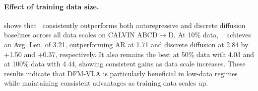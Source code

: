 \paragraph{Effect of training data size.}
 shows that \method~consistently outperforms both autoregressive and discrete diffusion baselines across all data scales on CALVIN ABCD$\rightarrow$D.
At 10\% data, \method~ achieves an Avg. Len. of 3.21, outperforming AR at 1.71 and discrete diffusion at 2.84 by +1.50 and +0.37, respectively. It also remains the best at 50\% data with 4.03 and at 100\% data with 4.44, showing consistent gains as data scale increases.
These results indicate that DFM-VLA is particularly beneficial in low-data regimes while maintaining consistent advantages as training data scales up.



